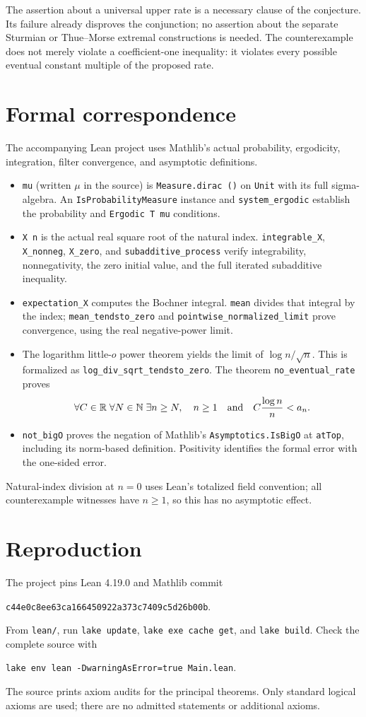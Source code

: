 \documentclass[11pt]{article}
\begin{document}
The assertion about a universal upper rate is a necessary clause of the
conjecture. Its failure already disproves the conjunction; no assertion about
the separate Sturmian or Thue--Morse extremal constructions is needed.
The counterexample does not merely violate a coefficient-one inequality:
it violates every possible eventual constant multiple of the proposed rate.

\section*{Formal correspondence}
The accompanying Lean project uses Mathlib's actual probability, ergodicity,
integration, filter convergence, and asymptotic definitions.
\begin{itemize}
\item \texttt{mu} (written $\mu$ in the source) is
\texttt{Measure.dirac ()} on \texttt{Unit} with its full sigma-algebra.
An \texttt{IsProbabilityMeasure} instance and \texttt{system\_ergodic}
establish the probability and \texttt{Ergodic T mu} conditions.
\item \texttt{X n} is the actual real square root of the natural index.
\texttt{integrable\_X}, \texttt{X\_nonneg}, \texttt{X\_zero}, and
\texttt{subadditive\_process} verify integrability, nonnegativity,
the zero initial value, and the full iterated subadditive inequality.
\item \texttt{expectation\_X} computes the Bochner integral.
\texttt{mean} divides that integral by the index;
\texttt{mean\_tendsto\_zero} and \texttt{pointwise\_normalized\_limit}
prove convergence, using the real negative-power limit.
\item The logarithm little-$o$ power theorem yields the limit of
$\log n/\sqrt n$. This is formalized as
\texttt{log\_div\_sqrt\_tendsto\_zero}.
The theorem \texttt{no\_eventual\_rate} proves
\[
 \forall C\in\mathbb R\;\forall N\in\mathbb N\;\exists n\geq N,
 \quad n\geq1\quad\hbox{and}\quad
 C\frac{\log n}{n}<a_n.
\]
\item \texttt{not\_bigO} proves the negation of Mathlib's
\texttt{Asymptotics.IsBigO} at \texttt{atTop}, including its norm-based
definition. Positivity identifies the formal error with the one-sided error.
\end{itemize}
Natural-index division at $n=0$ uses Lean's totalized field convention;
all counterexample witnesses have $n\geq1$, so this has no asymptotic effect.

\section*{Reproduction}
The project pins Lean 4.19.0 and Mathlib commit
\begin{center}\small\texttt{c44e0c8ee63ca166450922a373c7409c5d26b00b}.\end{center}
From \texttt{lean/}, run \texttt{lake update}, \texttt{lake exe cache get},
and \texttt{lake build}. Check the complete source with
\begin{center}\small\texttt{lake env lean -DwarningAsError=true Main.lean}.\end{center}
The source prints axiom audits for the principal theorems. Only standard
logical axioms are used; there are no admitted statements or additional axioms.
\end{document}
